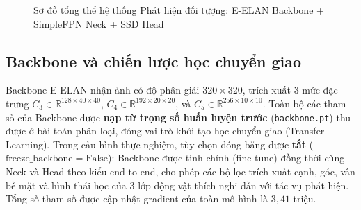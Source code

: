 \documentclass[fontsize=13pt,a4paper,oneside,DIV=calc,chapterprefix=true]{scrbook}
\begin{document}
\begin{figure}[H]
{%
}
\caption{Sơ đồ tổng thể hệ thống Phát hiện đối tượng: E-ELAN Backbone + SimpleFPN Neck + SSD Head}
\label{fig:det_pipeline}
\end{figure}

\subsection{Backbone và chiến lược học chuyển giao}
Backbone E-ELAN nhận ảnh có độ phân giải $320 \times 320$, trích xuất 3 mức đặc trưng $C_3 \in \mathbb{R}^{128 \times 40 \times 40}$, $C_4 \in \mathbb{R}^{192 \times 20 \times 20}$, và $C_5 \in \mathbb{R}^{256 \times 10 \times 10}$.
Toàn bộ các tham số của Backbone được \textbf{nạp từ trọng số huấn luyện trước} (\texttt{backbone.pt}) thu được ở bài toán phân loại, đóng vai trò khởi tạo học chuyển giao (Transfer Learning). Trong cấu hình thực nghiệm, tùy chọn đóng băng được \textbf{tắt} ($\mathrm{freeze\_backbone} = \mathrm{False}$): Backbone được tinh chỉnh (fine-tune) đồng thời cùng Neck và Head theo kiểu end-to-end, cho phép các bộ lọc trích xuất cạnh, góc, vân bề mặt và hình thái học của 3 lớp động vật thích nghi dần với tác vụ phát hiện. Tổng số tham số được cập nhật gradient của toàn mô hình là $3{,}41$ triệu.
\end{document}
